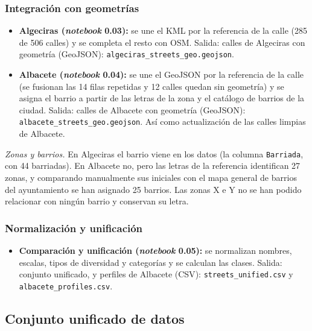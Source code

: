 \subsubsection{Integración con geometrías}
\label{subsubsec:arq-integracion-geometrias}

\begin{itemize}
  \item \textbf{Algeciras (\textit{notebook} 0.03):} se une el \gls{KML} por la referencia de la calle (285 de 506 calles) y se completa el resto con \gls{OSM}. Salida: calles de Algeciras con geometría (\gls{GeoJSON}): \texttt{algeciras\_streets\_geo.geojson}.
  \item \textbf{Albacete (\textit{notebook} 0.04):} se une el \gls{GeoJSON} por la referencia de la calle (se fusionan las 14 filas repetidas y 12 calles quedan sin geometría) y se asigna el barrio a partir de las letras de la zona y el catálogo de barrios de la ciudad. Salida: calles de Albacete con geometría (\gls{GeoJSON}): \texttt{albacete\_streets\_geo.geojson}. Así como actualización de las calles limpias de Albacete.
\end{itemize}

\noindent\textit{Zonas y barrios.} En Algeciras el barrio viene en los datos (la columna \texttt{Barriada}, con 44 barriadas). En Albacete no, pero las letras de la referencia identifican 27 zonas, y comparando manualmente sus iniciales con el mapa general de barrios del ayuntamiento \parencite{cartoteca_barrios_albacete_2016} se han asignado 25 barrios. Las zonas X e Y no se han podido relacionar con ningún barrio y conservan su letra.

\subsubsection{Normalización y unificación}
\label{subsubsec:arq-normalizacion-unificacion}

\begin{itemize}
  \item \textbf{Comparación y unificación (\textit{notebook} 0.05):} se normalizan nombres, escalas, tipos de diversidad y categorías y se calculan las clases. Salida: conjunto unificado, y perfiles de Albacete (\gls{CSV}): \texttt{streets\_unified.csv} y \texttt{albacete\_profiles.csv}.
\end{itemize}

\subsection{Conjunto unificado de datos}
\label{subsec:arq-unificacion-datos}

